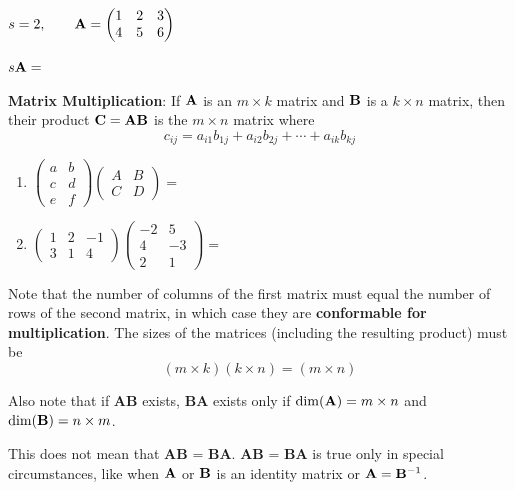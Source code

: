 \documentclass[]{book}
\theoremstyle{definition}
\theoremstyle{definition}
\theoremstyle{definition}
\theoremstyle{remark}
\let\BeginKnitrBlock\begin \let\EndKnitrBlock\end
\begin{document}
\BeginKnitrBlock{example}
\protect\hypertarget{exm:scalarmulti}{}{\label{exm:scalarmulti} }

\(s=2, \qquad {\bf A}=\begin{pmatrix} 1 & 2 & 3 \\ 4 & 5 & 6 \end{pmatrix}\)

\(s {\bf A} =\)
\EndKnitrBlock{example}

\textbf{Matrix Multiplication}: If \({\bf A}\) is an \(m\times k\)
matrix and \(\bf B\) is a \(k\times n\) matrix, then their product
\(\bf C = A B\) is the \(m\times n\) matrix where
\[c_{ij}=a_{i1}b_{1j}+a_{i2}b_{2j}+\cdots+a_{ik}b_{kj}\]

\BeginKnitrBlock{example}
\protect\hypertarget{exm:matrixmulti}{}{\label{exm:matrixmulti} }

\begin{enumerate}
\def\labelenumi{\arabic{enumi}.}
\item
  \(\begin{pmatrix} a&b\\c&d\\e&f \end{pmatrix} \begin{pmatrix} A&B\\C&D \end{pmatrix}  =\)
\item
  \(\begin{pmatrix} 1&2&-1\\3&1&4 \end{pmatrix} \begin{pmatrix} -2&5\\4&-3\\2&1\end{pmatrix} =\)
\end{enumerate}
\EndKnitrBlock{example}

Note that the number of columns of the first matrix must equal the
number of rows of the second matrix, in which case they are
\textbf{conformable for multiplication}. The sizes of the matrices
(including the resulting product) must be
\[(m\times k)(k\times n)=(m\times n)\]

Also note that if \textbf{AB} exists, \textbf{BA} exists only if
\(\dim({\bf A}) = m \times n\) and \(\dim({\bf B}) = n \times m\).

This does not mean that \textbf{AB} = \textbf{BA}. \textbf{AB} =
\textbf{BA} is true only in special circumstances, like when \({\bf A}\)
or \({\bf B}\) is an identity matrix or \({\bf A} = {\bf B}^{-1}\).
\end{document}
